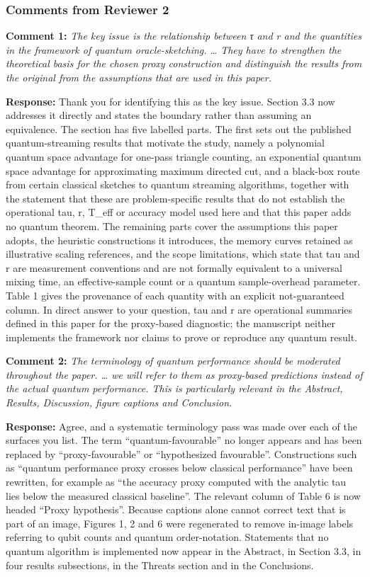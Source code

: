 \documentclass[
  11pt,
]{article}
\begin{document}
\subsubsection{Comments from Reviewer 2}\label{comments-from-reviewer-2}

\textbf{Comment 1:} \emph{The key issue is the relationship between τ
and r and the quantities in the framework of quantum oracle-sketching.
\ldots{} They have to strengthen the theoretical basis for the chosen
proxy construction and distinguish the results from the original from
the assumptions that are used in this paper.}

\textbf{Response:} Thank you for identifying this as the key issue.
Section 3.3 now addresses it directly and states the boundary rather
than assuming an equivalence. The section has five labelled parts. The
first sets out the published quantum-streaming results that motivate the
study, namely a polynomial quantum space advantage for one-pass triangle
counting, an exponential quantum space advantage for approximating
maximum directed cut, and a black-box route from certain classical
sketches to quantum streaming algorithms, together with the statement
that these are problem-specific results that do not establish the
operational tau, r, T\_eff or accuracy model used here and that this
paper adds no quantum theorem. The remaining parts cover the assumptions
this paper adopts, the heuristic constructions it introduces, the memory
curves retained as illustrative scaling references, and the scope
limitations, which state that tau and r are measurement conventions and
are not formally equivalent to a universal mixing time, an
effective-sample count or a quantum sample-overhead parameter. Table 1
gives the provenance of each quantity with an explicit not-guaranteed
column. In direct answer to your question, tau and r are operational
summaries defined in this paper for the proxy-based diagnostic; the
manuscript neither implements the framework nor claims to prove or
reproduce any quantum result.

\textbf{Comment 2:} \emph{The terminology of quantum performance should
be moderated throughout the paper. \ldots{} we will refer to them as
proxy-based predictions instead of the actual quantum performance. This
is particularly relevant in the Abstract, Results, Discussion, figure
captions and Conclusion.}

\textbf{Response:} Agree, and a systematic terminology pass was made
over each of the surfaces you list. The term ``quantum-favourable'' no
longer appears and has been replaced by ``proxy-favourable'' or
``hypothesized favourable''. Constructions such as ``quantum performance
proxy crosses below classical performance'' have been rewritten, for
example as ``the accuracy proxy computed with the analytic tau lies
below the measured classical baseline''. The relevant column of Table 6
is now headed ``Proxy hypothesis''. Because captions alone cannot
correct text that is part of an image, Figures 1, 2 and 6 were
regenerated to remove in-image labels referring to qubit counts and
quantum order-notation. Statements that no quantum algorithm is
implemented now appear in the Abstract, in Section 3.3, in four results
subsections, in the Threats section and in the Conclusions.
\end{document}
